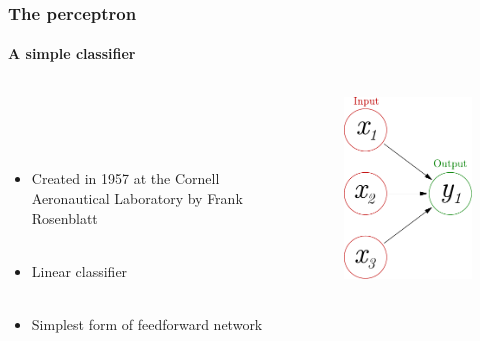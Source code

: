 \documentclass{beamer}
\newcommand{\figheight}{0.72\textheight}
\begin{document}
\begin{frame}
\frametitle{The perceptron}
\framesubtitle{A simple classifier}
  \begin{columns}[T]
    \begin{column}{.45\textwidth}    \ \\ \ \\ 
    \ \\
    \begin{itemize}
    
 
     \item<2->Created in 1957 at the Cornell Aeronautical Laboratory by Frank Rosenblatt  \\ \
\item<3->Linear classifier \\ \

\item<4->Simplest form of feedforward network \\ \

\end{itemize}

    \end{column}
    \begin{column}{.55\textwidth}
\begin{figure}[t]
\centering
 \includegraphics[height = \figheight]{./fig/perceptron.pdf}
\end{figure}
    \end{column}
  \end{columns}
\end{frame}
\end{document}
